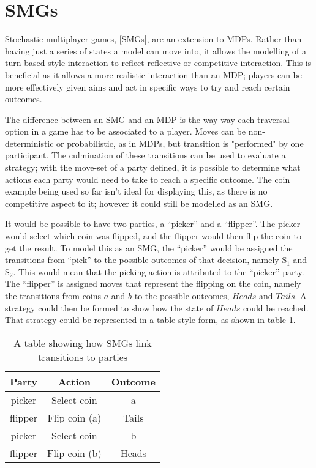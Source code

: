 \documentclass{l4proj}
\begin{document}
\section{SMGs}


Stochastic multiplayer games, [SMGs], are an extension to MDPs. Rather than having just a series of states a model can move into, it allows the modelling of a turn based style interaction to reflect reflective or competitive interaction. This is beneficial as it allows a more realistic interaction than an MDP; players can be more effectively given aims and act in specific ways to try and reach certain outcomes. 

The difference between an SMG and an MDP is the way way each traversal option in a game has to be associated to a player. Moves can be non-deterministic or probabilistic, as in MDPs, but transition is "performed" by one participant. The culmination of these transitions can be used to evaluate a strategy; with the move-set of a party defined, it is possible to determine what actions each party would need to take to reach a specific outcome. The coin example being used so far isn't ideal for displaying this, as there is no competitive aspect to it; however it could still be modelled as an SMG.

It would be possible to have two parties, a ``picker'' and a ``flipper''. The picker would select which coin was flipped, and the flipper would then flip the coin to get the result. To model this as an SMG, the ``picker'' would be assigned the transitions from ``pick'' to the possible outcomes of that decision, namely S$_1$ and S$_2$. This would mean that the picking action is attributed to the ``picker'' party. The ``flipper'' is assigned moves that represent the flipping on the coin, namely the transitions from coins $a$ and $b$ to the possible outcomes, $Heads$ and $Tails$. A strategy could then be formed to show how the state of $Heads$ could be reached. That strategy could be represented in a table style form, as shown in table \ref{smgTable}.

\begin{table}[]
\centering
\begin{tabular}{ c || c || c }
  \hline                       
  Party & Action & Outcome \\
  \hline
  picker & Select coin & a  \\
  flipper & Flip coin (a) & Tails \\
  picker & Select coin & b \\
  flipper & Flip coin (b) & Heads \\
  \hline  
\end{tabular}
\caption{A table showing how SMGs link transitions to parties}
\label{smgTable}
\end{table}
\end{document}
